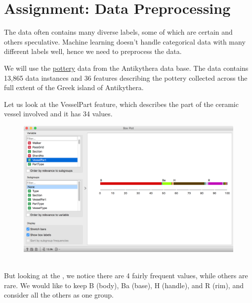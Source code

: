 \chapter{Assignment: Data Preprocessing}
\label{ch:arheo_data_preprocessing}

 The data often contains many diverse labels, some of which are certain and others speculative. Machine learning doesn't handle categorical data with many different labels well, hence we need to preprocess the data.

We will use the \href{https://archaeologydataservice.ac.uk/catalogue/adsdata/arch-1115-2/dissemination/csv/pottery/pottery.csv}{pottery} data from the Antikythera data base. The data contains 13,865 data instances and 36 features describing the pottery collected across the full extent of the Greek island of Antikythera.

Let us look at the VesselPart feature, which describes the part of the ceramic vessel involved and it has 34 values.

\begin{figure}[h]
    \centering
    \includegraphics[scale=0.35]{box-plot-vesselpart.png}
    \caption{$\;$} %
\end{figure}

But looking at the , we notice there are 4 fairly frequent values, while others are rare. We would like to keep B (body), Ba (base), H (handle), and R (rim), and consider all the others as one group.

